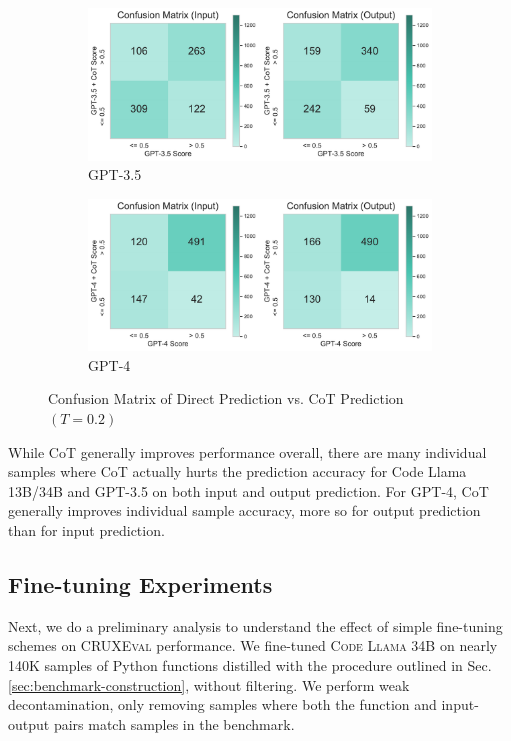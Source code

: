 \documentclass{article}
\newcommand{\benchmark}{\textsc{CRUXEval}\xspace}
\newcommand{\codellamalarge}{\textsc{Code Llama 34B}\xspace}
\begin{document}
\begin{figure}[H]
\begin{subfigure}[t]{0.49\textwidth}
         \centering
         \includegraphics[width=\textwidth]{figs/confusion_cot/confusion_gpt35_gpt35_cot.pdf}
         \caption{GPT-3.5}
         \label{fig:confusion-cot-gpt35}
     \end{subfigure}%
     \hfill
     \begin{subfigure}[t]{0.49\textwidth}
         \centering
         \includegraphics[width=\textwidth]{figs/confusion_cot/confusion_gpt4_gpt4_cot.pdf}
         \caption{GPT-4}
         \label{fig:confusion-cot-gpt4}
     \end{subfigure}
     \caption{Confusion Matrix of Direct Prediction vs. CoT Prediction $(T=0.2)$}
     \label{fig:confusion-cot-all}
\end{figure}


\begin{tcolorbox}[colback=lightgreen, boxrule=0pt, arc=10pt, outer arc=10pt]
While CoT generally improves performance overall, there are many individual samples where CoT actually hurts the prediction accuracy for Code Llama 13B/34B and GPT-3.5 on both input and output prediction. For GPT-4, CoT generally improves individual sample accuracy, more so for output prediction than for input prediction.
\end{tcolorbox}

\subsection{Fine-tuning Experiments} \label{subsec:finetuning}
Next, we do a preliminary analysis to understand the effect of simple fine-tuning schemes on \benchmark performance. We fine-tuned \codellamalarge on nearly 140K samples of Python functions distilled with the procedure outlined in Sec. \ref{sec:benchmark-construction}, without filtering. We perform weak decontamination, only removing samples where both the function and input-output pairs match samples in the benchmark. 
\end{document}
